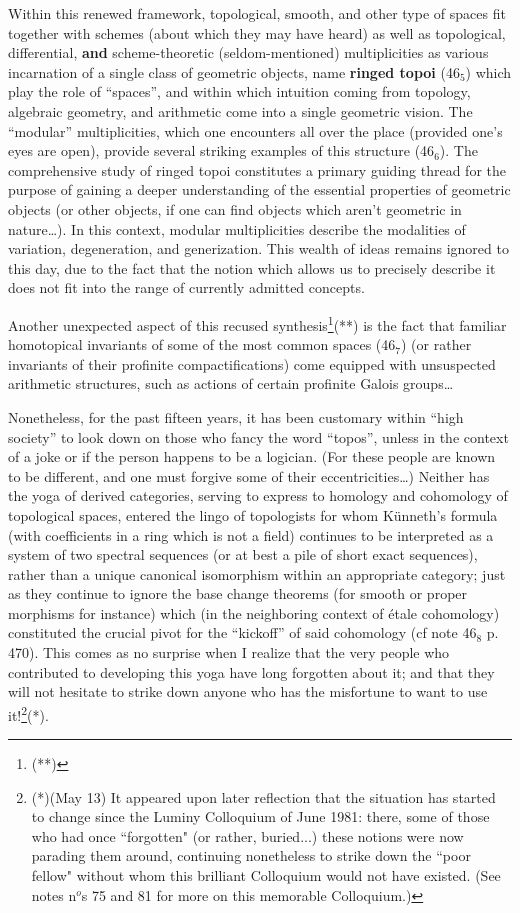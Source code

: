 Within this renewed framework, topological, smooth, and other type of spaces
fit together with schemes (about which they may have heard) 
as well as topological, differential, \textbf{and} scheme-theoretic
(seldom-mentioned) multiplicities
as various incarnation of 
a single class of geometric objects, name \textbf{ringed topoi} 
(46$_5$) which play the role of ``spaces'', and within 
which intuition coming from topology, algebraic geometry, and arithmetic come
into a single geometric vision.
The ``modular'' multiplicities,
which one encounters all over the place
(provided one's eyes are open), provide several striking examples of this structure (46$_6$).
The comprehensive study of ringed topoi constitutes a primary guiding thread for the
purpose of gaining a deeper understanding of the essential properties of geometric
objects (or other objects, if one can find objects which aren't geometric in
nature\ldots).
In this context, modular multiplicities describe the modalities of variation,
degeneration, and generization.
This wealth of ideas remains ignored to this day, 
due to the fact that the notion which allows us to precisely describe it does not fit into 
the range of currently admitted concepts.

Another unexpected aspect of this recused synthesis\footnote{(**)}(**)
is the fact that familiar homotopical invariants 
of some of the most common spaces
(46$_7$)
(or rather invariants of their profinite compactifications) 
come equipped with unsuspected arithmetic structures, such as actions of certain profinite
Galois groups\ldots

Nonetheless, for the past fifteen years, it has been customary within ``high society'' to 
look down on those who fancy the word ``topos'', unless in the context of a
joke or if the person happens to be a logician.
(For these people are known to be different, and one must forgive some of their
eccentricities\ldots)
Neither has the yoga of derived categories, serving to express to homology and cohomology
of topological spaces, entered the lingo of topologists for whom K\"unneth's formula
(with coefficients in a ring which is not a field)
continues to be interpreted as a system of two spectral sequences (or at best a pile of
short exact sequences), 
rather than a unique canonical isomorphism within an appropriate category;
just as they continue to ignore the base change theorems (for smooth or proper morphisms
for instance) which (in the neighboring context of \'etale cohomology) constituted the
crucial pivot for the ``kickoff'' of said cohomology (cf note 46$_8$ p. 470).
This comes as no surprise when I realize that the very people who contributed to developing
this yoga have long forgotten about it; and that they will not hesitate to 
strike down anyone who has the misfortune to want to use it!\footnote{(*)(May 13) It appeared upon later reflection that the situation has started to change since the Luminy Colloquium of June 1981: there, some of those who had once ``forgotten" (or rather, buried...) these notions were now parading them around,  continuing nonetheless to strike down the ``poor fellow" without whom this brilliant Colloquium would not have existed. (See notes n$^o$s 75 and 81 for more on this memorable Colloquium.) }(*).

